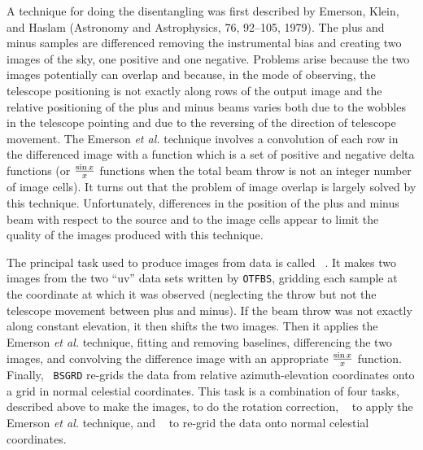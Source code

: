      A technique for doing the disentangling was first described by
Emerson, Klein, and Haslam (Astronomy and Astrophysics, 76, 92--105,
1979).  The plus and minus samples are differenced removing the
instrumental bias and creating two images of the sky, one positive and
one negative.  Problems arise because the two images potentially can
overlap and because, in the  mode of observing, the
telescope positioning is not exactly along rows of the output image
and the relative positioning of the plus and minus beams varies both
due to the wobbles in the telescope pointing and due to the reversing
of the direction of telescope movement.  The Emerson {\it et al.}
technique involves a convolution of each row in the differenced image
with a function which is a set of positive and negative delta
functions (or ${\sin x}\over{x}$ functions when the total beam throw
is not an integer number of image cells).  It turns out that the
problem of image overlap is largely solved by this technique.
Unfortunately, differences in the position of the plus and minus beam
with respect to the source and to the image cells appear to limit the
quality of the images produced with this technique.

     The principal task used to produce images from
 data is called \hbox{{\tt
{}}}.  It makes two images from the two ``uv'' data sets
written by {\tt OTFBS}, gridding each sample at the coordinate at
which it was observed (neglecting the throw but not the telescope
movement between plus and minus).  If the beam throw was not exactly
along constant elevation, it then shifts the two images.  Then it
applies the Emerson {\it et al.} technique, fitting and removing
baselines, differencing the two images, and convolving the difference
image with an appropriate ${\sin x}\over{x}$ function.  Finally, {\tt
BSGRD} re-grids the data from relative azimuth-elevation coordinates
onto a grid in normal celestial coordinates.  This task is a
combination of four tasks, {\tt {}} described above to make
the images, {\tt {}} to do the rotation correction, {\tt
{}} to apply the Emerson {\it et al.} technique, and {\tt
{}} to re-grid the data onto normal celestial coordinates.

